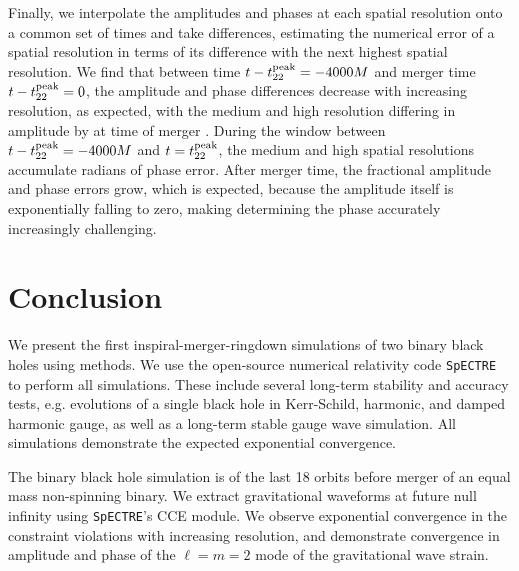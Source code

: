\begin{bibunit}[unsrtnat]
Finally, we interpolate the amplitudes and phases at each spatial resolution
onto a common set of times and take differences, estimating the numerical error
of a spatial resolution in terms of its difference with the next highest spatial
resolution. We find that between time $t - t_{22}^{\rm peak}=-4000 M$ and merger
time $t-t_{22}^{\rm peak}=0$, the amplitude and phase differences decrease with
increasing resolution, as expected, with the medium and high resolution
differing in amplitude by  at time of merger 
. During the window between
$t - t_{22}^{\rm peak}=-4000 M$ and $t = t_{22}^{\rm peak}$, the medium and high
spatial resolutions accumulate  radians of phase error. After
merger time, the fractional amplitude and phase errors grow, which is expected,
because the amplitude itself is exponentially falling to zero, making
determining the phase accurately increasingly challenging.

\section{Conclusion\label{sec:conclusion}}

We present the first inspiral-merger-ringdown simulations of two binary black
holes using  methods. We use the open-source numerical
relativity code \texttt{SpECTRE}~\cite{spectrecode_2024} to perform all
simulations. These include several long-term stability and accuracy tests, e.g.
evolutions of a single black hole in Kerr-Schild, harmonic, and damped
harmonic gauge, as well as a long-term stable gauge wave simulation. All
simulations demonstrate the expected exponential convergence.

The binary black hole simulation is of the last 18 orbits before merger of an
equal mass non-spinning binary. We extract gravitational waveforms at future
null infinity using \texttt{SpECTRE}'s CCE module. We observe exponential
convergence in the constraint violations with increasing resolution, and
demonstrate convergence in amplitude and phase of the $\ell=m=2$ mode of the
gravitational wave strain. 


\end{bibunit}
